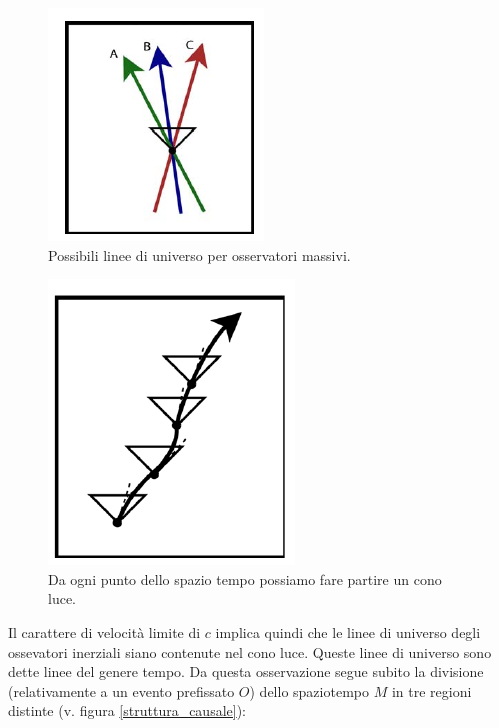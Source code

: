 \begin{figure}[htbp]
   \centering
   \includegraphics[scale=0.7]{immagini/minkowski/osservatori_coni_luce2}
   \caption{\label{osservatori_coni_luce2} Possibili linee di universo per osservatori massivi.}
\end{figure}

\begin{figure}[htbp]
   \centering
   \includegraphics[scale=0.7]{immagini/minkowski/osservatori_coni_luce3}
   \caption{Da ogni punto dello spazio tempo possiamo fare partire un cono luce.}
\end{figure}


Il carattere di velocità limite di $c$ implica quindi che le linee di universo degli 
ossevatori inerziali siano contenute nel cono luce. Queste linee di universo
sono dette linee del genere tempo. Da questa osservazione segue subito la divisione (relativamente a un
evento prefissato $O$) dello spaziotempo $M$ in tre regioni distinte (v. figura
\ref{struttura_causale}):

